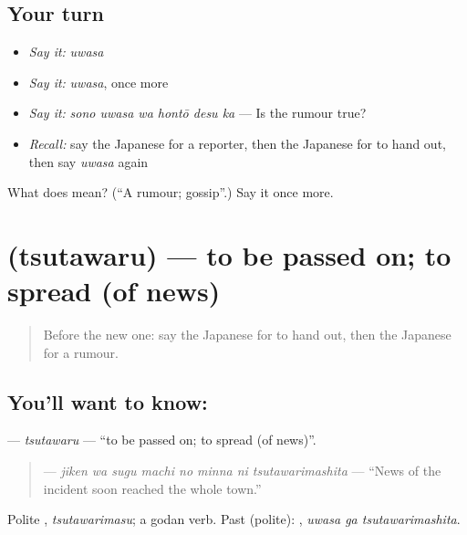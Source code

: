\subsection*{Your turn}
\begin{itemize}
\raggedright
  \item \emph{Say it:} \emph{uwasa}
  \item \emph{Say it:} \emph{uwasa}, once more
  \item \emph{Say it:} \emph{sono uwasa wa hontō desu ka} — Is the rumour true?
  \item \emph{Recall:} say the Japanese for a reporter, then the Japanese for to hand out, then say \emph{uwasa} again
\end{itemize}

\begin{tcolorbox}[breakable,colback=teal!4,colframe=teal!35!black,title={Before you move on}]
What does  mean? (\textquotedblleft{}A rumour; gossip\textquotedblright{}.) Say it once more.
\end{tcolorbox}
\section[\texorpdfstring{\ja{つたわる} (tsutawaru)}{つたわる (tsutawaru)}]{ (tsutawaru) — to be passed on; to spread (of news)}

\label{lesson:JA-C281-tsutawaru}



\begin{quote}
Before the new one: say the Japanese for to hand out, then the Japanese for a rumour.
\end{quote}

\subsection*{You'll want to know: }
\textbf{} — \emph{tsutawaru} — \textquotedblleft{}to be passed on; to spread (of news)\textquotedblright{}.

\begin{quote}
\textbf{    } — \emph{jiken wa sugu machi no minna ni tsutawarimashita} — \textquotedblleft{}News of the incident soon reached the whole town.\textquotedblright{}
\end{quote}

Polite \textbf{}, \emph{tsutawarimasu}; a godan verb. Past (polite): \textbf{ }, \emph{uwasa ga tsutawarimashita}.

